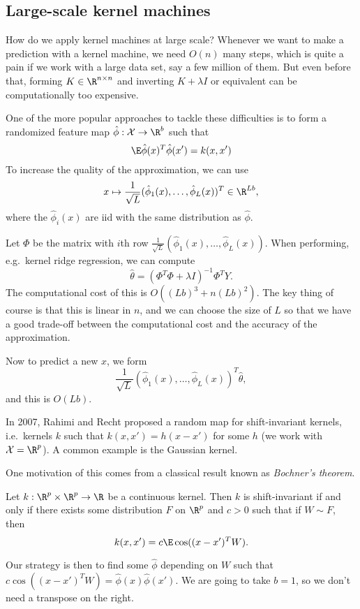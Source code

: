 \documentclass[a4paper]{article}
\begin{document}
\subsection{Large-scale kernel machines}
How do we apply kernel machines at large scale? Whenever we want to make a prediction with a kernel machine, we need $O(n)$ many steps, which is quite a pain if we work with a large data set, say a few million of them. But even before that, forming $K \in \R^{n \times n}$ and inverting $K + \lambda I$ or equivalent can be computationally too expensive.

One of the more popular approaches to tackle these difficulties is to form a randomized feature map $\hat{\phi}: \mathcal{X} \to \R^b$ such that
\[
  \E \hat{\phi}(x)^T \hat{\phi}(x') = k(x, x')
\]
To increase the quality of the approximation, we can use
\[
  x \mapsto \frac{1}{\sqrt{L}}(\hat{\phi}_1(x), \ldots, \hat{\phi}_L(x))^T \in \R^{Lb},
\]
where the $\hat{\phi}_i(x)$ are iid with the same distribution as $\hat{\phi}$.

Let $\Phi$ be the matrix with $i$th row $\frac{1}{\sqrt{L}}(\hat{\phi}_1(x), \ldots, \hat{\phi}_L(x))$. When performing, e.g.\ kernel ridge regression, we can compute
\[
  \hat{\theta} = (\Phi^T \Phi + \lambda I)^{-1} \Phi^T Y.
\]
The computational cost of this is $O((Lb)^3 + n (Lb)^2)$. The key thing of course is that this is linear in $n$, and we can choose the size of $L$ so that we have a good trade-off between the computational cost and the accuracy of the approximation.

Now to predict a new $x$, we form
\[
  \frac{1}{\sqrt{L}} (\hat{\phi}_1(x), \ldots, \hat{\phi}_L(x))^T \hat{\theta},
\]
and this is $O(Lb)$.

In 2007, Rahimi and Recht proposed a random map for shift-invariant kernels, i.e.\ kernels $k$ such that $k(x, x') = h(x - x')$ for some $h$ (we work with $\mathcal{X} = \R^p$). A common example is the Gaussian kernel.

One motivation of this comes from a classical result known as \emph{Bochner's theorem}.

\begin{thm}
  Let $k: \R^p \times \R^p \to \R$ be a continuous kernel. Then $k$ is shift-invariant if and only if there exists some distribution $F$ on $\R^p$ and $c > 0$ such that if $W \sim F$, then
  \[
    k(x, x') = c\E \cos((x - x')^T W).
  \]
\end{thm}
Our strategy is then to find some $\hat{\phi}$ depending on $W$ such that $c\cos((x - x')^T W) = \hat{\phi}(x) \hat{\phi}(x')$. We are going to take $b = 1$, so we don't need a transpose on the right.
\end{document}
